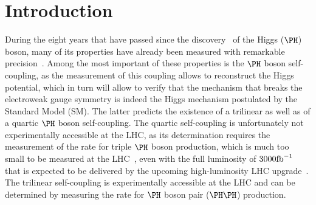\section{Introduction}
\label{sec:introduction}

During the eight years that have passed since the discovery~\cite{Higgs-Discovery_CMS,Higgs-Discovery_CMS_long,Higgs-Discovery_ATLAS} of the Higgs ($\PHiggs$) boson,
many of its properties have already been measured with remarkable precision~\cite{HIG-14-042,HIG-15-002,ATLAS_SpinCP,HIG-14-018,HIG-16-041}.
Among the most important of these properties is the $\PHiggs$ boson self-coupling, as the measurement of this coupling allows to reconstruct the Higgs potential,
which in turn will allow to verify that the mechanism that breaks the electroweak gauge symmetry is indeed the Higgs mechanism postulated by the Standard Model (SM).
The latter predicts the existence of a trilinear as well as of a quartic $\PHiggs$ boson self-coupling.
The quartic self-coupling is unfortunately not experimentally accessible at the LHC,
as its determination requires the measurement of the rate for triple $\PHiggs$ boson production, 
which is much too small to be measured at the LHC~\cite{de_Florian_2020}, 
even with the full luminosity of $3000\text{fb}^{-1}$ that is expected to be delivered by the upcoming high-luminosity LHC upgrade~\cite{HL-LHC-TDR}.
The trilinear self-coupling is experimentally accessible at the LHC and can be determined by measuring the rate for $\PHiggs$ boson pair ($\HH$) production.

